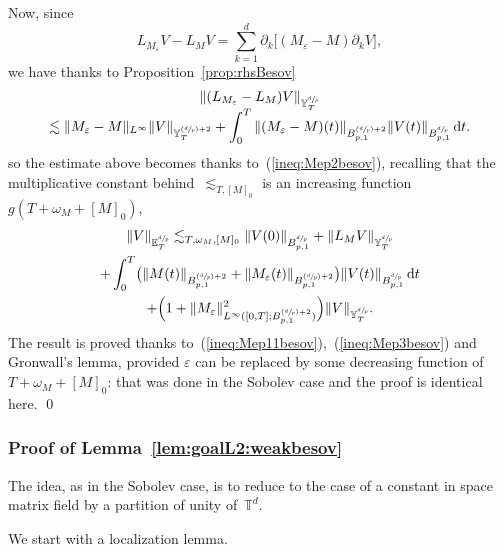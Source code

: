 \documentclass[10pt]{amsart}
\newcommand{\Psfrac}[2]{(\sfrac{#1}{#2})}
\theoremstyle{definition}
\newcommand\T{\mathbb{T}}
\newcommand\dd{\mathrm{d}}
\let\ep\varepsilon
\begin{document}
Now, since\vspace*{-3pt}
\[
L_{M_\ep }V-L_{M }V = \sum_{k=1}^d \partial_k \bigl[(M_\ep-M)\partial_k V\bigr],
\]
we have thanks to Proposition~\ref{prop:rhsBesov}\vspace*{-5pt}
\begin{multline*}
\|(L_{M_\ep}-L_M)V\|_{ {\mathbb Y}^{\sfrac dp}_T}\\[-5pt]
\lesssim \|M_\ep-M\|_{L^\infty } \|V\|_{ {\mathbb Y}^{\Psfrac dp+2}_T} +
\int_0^T \| (M_\ep-M)(t)\|_{B^{\Psfrac dp+2}_{p,1}} \|V(t)\|_{B^{\sfrac dp}_{p,1}} \, \dd t.
\end{multline*}
so the estimate above becomes thanks to~(\ref{ineq:Mep2besov}), recalling that the multiplicative constant behind~$ \lesssim_{T,[M]_0}$ is an increasing function~$ g(T+\omega_M+[M]_0)$,\vspace*{-5pt}
\begin{multline*}
\|V\|_{{\mathbb E}^{\sfrac dp}_T} \lesssim_{T,\omega_M,[M]_0} \|V(0)\|_{B^{\sfrac dp}_{p,1}} + \| L_{M } V \|_{{\mathbb Y}^{\sfrac dp}_T } \\
+
\int_0^T\bigl(\| M(t)\|_{B^{\Psfrac dp+2}_{p,1}}+ \| M_\ep(t)\|_{B^{\Psfrac dp+2}_{p,1}}\bigr) \|V(t)\|_{B^{\sfrac dp}_{p,1}} \, \dd t \\
+ \Bigl(1+\|M_\ep\|^2_{ L^\infty ([0,T];B^{\Psfrac dp+2}_{p,1}) }\Bigr) \|V\|_ {{\mathbb Y}^{\sfrac dp}_T}.
\end{multline*}
The result is proved thanks to~(\ref{ineq:Mep11besov}),~(\ref{ineq:Mep3besov}) and Gronwall's lemma, provided $\ep$ can be replaced by some decreasing function of $T+\omega_M+[M]_0$: that was done in the Sobolev case and the proof is identical here. \qed

\subsubsection{Proof of Lemma~\ref{lem:goalL2:weakbesov}}\label{subsec:proof_lemmabesov}
The idea, as in the Sobolev case, is to reduce to the case of a constant in space matrix field by a partition of unity of~$ \T^d$.

We start with a localization lemma.
\end{document}
